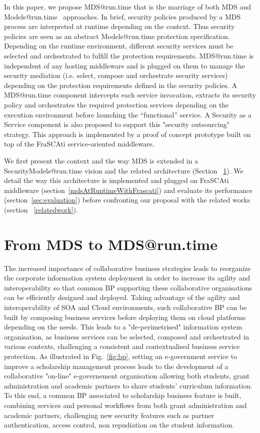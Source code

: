 \documentclass[runningheads,a4paper]{llncs}
\begin{document}
In this paper, we propose MDS@run.time that is the marriage of both MDS and Models@run.time~\cite{blair2009models} approaches.
In brief, security policies produced by a MDS process are interpreted at runtime depending on the context.
Thus security policies are seen as an abstract Models@run.time protection specification.
Depending on the runtime environment, different security services must be selected and orchestrated to fulfill the protection requirements.
MDS@run.time is independent of any hosting middleware and
is plugged on them to manage the security mediation (i.e. select, compose and orchestrate security services) depending on the protection requirements defined in the security policies.
A MDS@run.time component intercepts each service invocation, extracts its security policy and orchestrates the required protection services depending on the execution environment before launching the “functional” service.
A Security as a Service component is also proposed to support this "security outsourcing" strategy. 
This approach is implemented by a proof of concept prototype built on top of the FraSCAti service-oriented middleware.

We first present the context and the way MDS is extended in a SecurityModels@run.time vision and the related architecture (Section ~\ref{mdsToMds@Runtime}). We detail the way this architecture is implemented and plugged on FraSCAti middleware (section~\ref{mdsAtRuntimeWithFrascati}) and evaluate its performance (section~\ref{sec:evaluation}) before confronting our proposal with the related works (section ~\ref{relatedwork}).  


\section{From MDS to MDS@run.time}
\label{mdsToMds@Runtime}
The increased importance of collaborative business strategies leads to reorganize the corporate information system deployment in order to increase its agility and interoperability so that common BP supporting these collaborative organisations can be efficiently designed and deployed. Taking advantage of the agility and interoperability of SOA and Cloud environments, such collaborative BP can be built by composing business services before deploying them on cloud platforms depending on the needs. This leads to a "de-perimetrised" information system organisation, as business services can be selected, composed and orchestrated in various contexts, challenging a consistent and contextualised business service protection.
As illustrated in Fig.~\ref{fig:bp}, setting an e-government service to improve a scholarship management process leads to the development of a collaborative "on-line" e-governement organisation allowing both students, grant administration and academic partners to share students' curriculum information. To this end, a common BP associated to scholarship business feature is built, combining services and personal workflows from both grant administration and academic partners, challenging new security features such as partner authentication, access control, non repudiation on the student information. 
\end{document}

